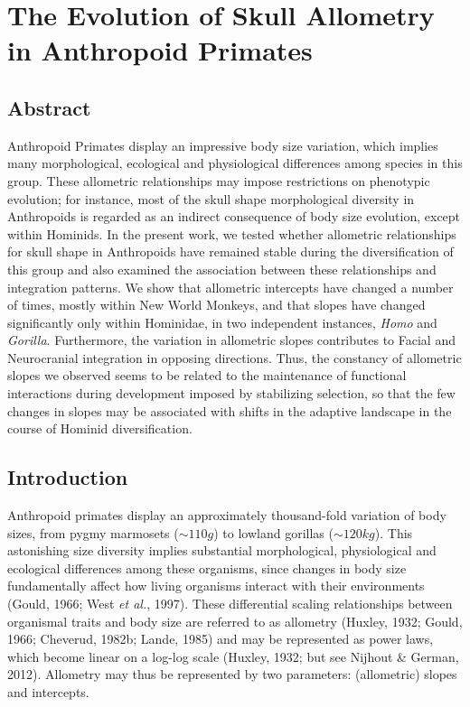 \documentclass[12pt,twoside]{report}
\begin{document}
\newpage
\chapter{The Evolution of Skull Allometry in Anthropoid Primates}
\label{ch:allo}

\section{Abstract}\label{abstract-1}

Anthropoid Primates display an impressive body size variation, which
implies many morphological, ecological and physiological differences
among species in this group. These allometric relationships may impose
restrictions on phenotypic evolution; for instance, most of the skull
shape morphological diversity in Anthropoids is regarded as an indirect
consequence of body size evolution, except within Hominids. In the
present work, we tested whether allometric relationships for skull shape
in Anthropoids have remained stable during the diversification of this
group and also examined the association between these relationships and
integration patterns. We show that allometric intercepts have changed a
number of times, mostly within New World Monkeys, and that slopes have
changed significantly only within Hominidae, in two independent
instances, \emph{Homo} and \emph{Gorilla}. Furthermore, the variation in
allometric slopes contributes to Facial and Neurocranial integration in
opposing directions. Thus, the constancy of allometric slopes we
observed seems to be related to the maintenance of functional
interactions during development imposed by stabilizing selection, so
that the few changes in slopes may be associated with shifts in the
adaptive landscape in the course of Hominid diversification.

\section{Introduction}\label{introduction-1}

Anthropoid primates display an approximately thousand-fold variation of
body sizes, from pygmy marmosets ($\sim 110g$) to lowland gorillas
($\sim 120kg$). This astonishing size diversity implies substantial
morphological, physiological and ecological differences among these
organisms, since changes in body size fundamentally affect how living
organisms interact with their environments (Gould, 1966; West \emph{et
al.}, 1997). These differential scaling relationships between organismal
traits and body size are referred to as allometry (Huxley, 1932; Gould,
1966; Cheverud, 1982b; Lande, 1985) and may be represented as power
laws, which become linear on a log-log scale (Huxley, 1932; but see
Nijhout \& German, 2012). Allometry may thus be represented by two
parameters: (allometric) slopes and intercepts.
\end{document}
